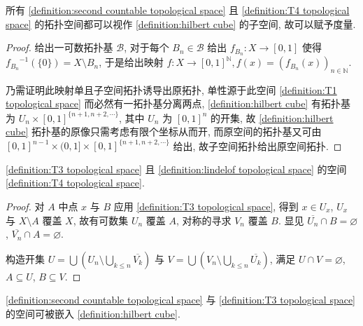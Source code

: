 \begin{theorem}
    所有 \ref{definition:second countable topological space} 且 \ref{definition:T4 topological space} 的拓扑空间都可以视作 \ref{definition:hilbert cube} 的子空间,
    故可以赋予度量.

    \begin{proof}
        给出一可数拓扑基 \(\mathcal{B}\), 对于每个 \(B_n \in \mathcal{B}\) 给出 \(f_{B_n} : X \to [0,1]\) 使得 \({f_{B_n}}^{-1} (\{0\}) = X \setminus B_n\),
        于是给出映射 \(f : X \to [0,1]^\mathbb{N}, f(x) = (f_{B_n} (x))_{n \in \mathbb{N}}\).

        乃需证明此映射单且子空间拓扑诱导出原拓扑, 单性源于此空间 \ref{definition:T1 topological space} 而必然有一拓扑基分离两点,
        \ref{definition:hilbert cube} 有拓扑基为 \(U_n \times {[0,1]}^{\{n+1, n+2, \cdots\}}\), 其中 \(U_n\) 为 \({[0,1]}^n\) 的开集,
        故 \ref{definition:hilbert cube} 拓扑基的原像只需考虑有限个坐标从而开, 而原空间的拓扑基又可由 \({[0,1]}^{n - 1} \times (0,1] \times {[0,1]}^{\{n+1, n+2, \cdots\}}\) 给出,
        故子空间拓扑给出原空间拓扑. 
    \end{proof}
\end{theorem}

\begin{lemma}[Tychonoff]
    \ref{definition:T3 topological space} 且 \ref{definition:lindelof topological space} 的空间 \ref{definition:T4 topological space}.

    \begin{proof}
        对 \(A\) 中点 \(x\) 与 \(B\) 应用 \ref{definition:T3 topological space}, 得到 \(x \in U_x\),
        \(U_x\) 与 \(X \setminus A\) 覆盖 \(X\), 故有可数集 \(U_n\) 覆盖 \(A\), 对称的寻求 \(V_n\) 覆盖 \(B\).
        显见 \(\overline{U_n} \cap B = \varnothing\), \(\overline{V_n} \cap A = \varnothing\).

        构造开集 \(U = \bigcup (U_n \setminus \bigcup_{k \le n} \overline{V_k})\) 与 \(V = \bigcup (V_n \setminus \bigcup_{k \le n} \overline{U_k})\),
        满足 \(U \cap V = \varnothing\), \(A \subseteq U\), \(B \subseteq V\).
    \end{proof}
\end{lemma}

\begin{corollary}
    \ref{definition:second countable topological space} 与 \ref{definition:T3 topological space} 的空间可被嵌入 \ref{definition:hilbert cube}.
\end{corollary}

